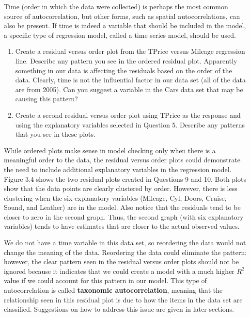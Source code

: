 \documentclass[
]{report}
\begin{document}
Time (order in which the data were collected) is perhaps the most common source of autocorrelation, but other forms, such as spatial autocorrelations, can also be present. If time is indeed a variable that should be included in the model, a specific type of regression model, called a time series model, should be used.

\begin{enumerate}
\def\labelenumi{\arabic{enumi}.}
\setcounter{enumi}{8}
\item
  Create a residual versus order plot from the TPrice versus Mileage regression line. Describe any pattern you see in the ordered residual plot. Apparently something in our data is affecting the residuals based on the order of the data. Clearly, time is not the influential factor in our data set (all of the data are from 2005). Can you suggest a variable in the Cars data set that may be causing this pattern?
\item
  Create a second residual versus order plot using TPrice as the response and using the explanatory variables selected in Question 5. Describe any patterns that you see in these plots.
\end{enumerate}

While ordered plots make sense in model checking only when there is a meaningful order to the data, the residual versus order plots could demonstrate the need to include additional explanatory variables in the regression model. Figure 3.4 shows the two residual plots created in Questions 9 and 10. Both plots show that the data points are clearly clustered by order. However, there is less clustering when the six explanatory variables (Mileage, Cyl, Doors, Cruise, Sound, and Leather) are in the model. Also notice that the residuals tend to be closer to zero in the second graph. Thus, the second graph (with six explanatory variables) tends to have estimates that are closer to the actual observed values.

We do not have a time variable in this data set, so reordering the data would not change the meaning of the data. Reordering the data could eliminate the pattern; however, the clear pattern seen in the residual versus order plots should not be ignored because it indicates that we could create a model with a much higher \(R^2\) value if we could account for this pattern in our model. This type of autocorrelation is called \textbf{taxonomic autocorrelation}, meaning that the relationship seen in this residual plot is due to how the items in the data set are classified. Suggestions on how to address this issue are given in later sections.
\end{document}
